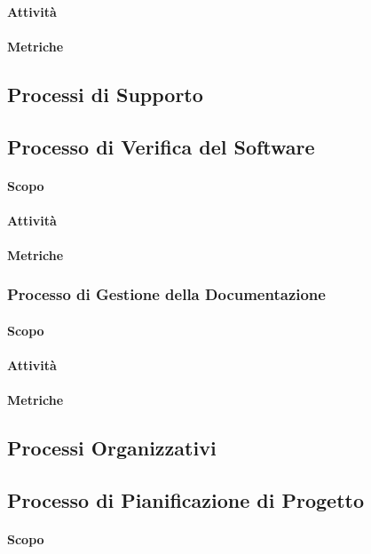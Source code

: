 		\paragraph{Attività}
		\paragraph{Metriche}
\subsection{Processi di Supporto}
	\subsection{Processo di Verifica del Software}
		\paragraph{Scopo}
		\paragraph{Attività}
		\paragraph{Metriche}
	\subsubsection{Processo di Gestione della Documentazione}
		\paragraph{Scopo}
		\paragraph{Attività}
		\paragraph{Metriche}
\subsection{Processi Organizzativi}
	\subsection{Processo di Pianificazione di Progetto}	
		\paragraph{Scopo}
